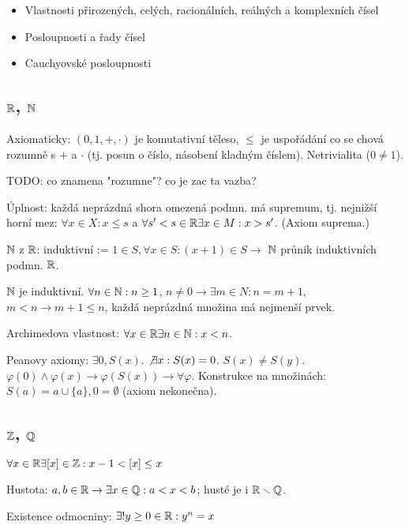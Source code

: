 \begin{understood}
	\begin{itemize}
	\item Vlastnosti přirozených, celých, racionálních, reálných a
		komplexních čísel
	\item Posloupnosti a řady čísel
	\item Cauchyovské posloupnosti
	\end{itemize}
\end{understood}

\subsection{$\mathbb{R}$, $\mathbb{N}$}
Axiomaticky: $(0,1,+,\cdot)$ je komutativní těleso, $\leq$ je uspořádání co se
chová rozumně s $+$ a $\cdot$ (tj. posun o číslo, násobení kladným číslem).
Netrivialita ($0\neq 1$).

TODO: co znamena "rozumne"? co je zac ta vazba?

Úplnost: každá neprázdná shora omezená podmn. má supremum, tj. nejnižší horní
mez: $\forall x\in X: x\leq s$ a $\forall s'<s\in\mathbb{R} \exists x\in M: x>s'$.
(Axiom suprema.)

$\mathbb{N}$ z $\mathbb{R}$: induktivní := $1\in S, \forall x\in S: (x+1)\in S \longrightarrow$
$\mathbb{N}$ průnik induktivních podmn. $\mathbb{R}$.

$\mathbb{N}$ je induktivní. $\forall n\in\mathbb{N}:n\geq 1$,
$n\neq 0\rightarrow\exists m\in N: n=m+1$, $m<n\rightarrow m+1\leq n$,
každá neprázdná množina má nejmenší prvek.

\begin{understood}
Archimedova vlastnost: $\forall x\in\mathbb{R}\exists n\in\mathbb{N}:x<n$.
\end{understood}

Peanovy axiomy: $\exists 0, S(x)$. $\not\exists x: S(x)=0$. $S(x)\neq S(y)$.
$\varphi(0)\wedge \varphi(x)\rightarrow\varphi(S(x))\longrightarrow\forall\varphi$.
Konstrukce na množinách: $S(a)=a\cup\{a\},0=\emptyset$ (axiom nekonečna).

\subsection{$\mathbb{Z}$, $\mathbb{Q}$}

$\forall x\in\mathbb{R}\exists [x]\in\mathbb{Z}: x-1<[x]\leq x$

Hustota: $a,b\in\mathbb{R}\rightarrow\exists x\in\mathbb{Q}: a<x<b$; husté je i
$\mathbb{R}\smallsetminus\mathbb{Q}$.

Existence odmocniny: $\exists! y\geq 0\in\mathbb{R}: y^n=x$

